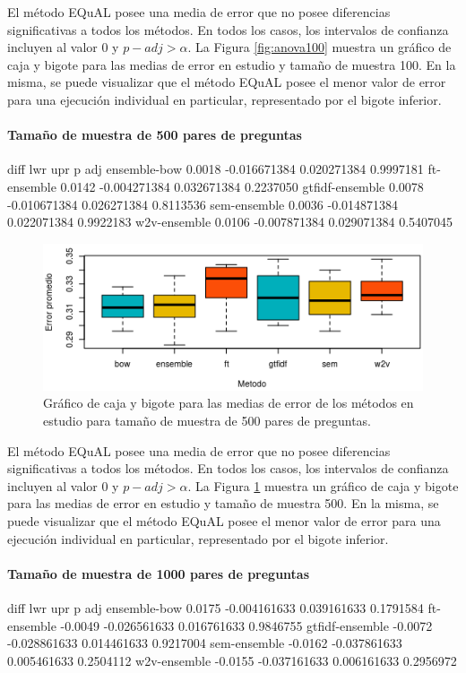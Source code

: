 \bigskip El método EQuAL posee una media de error que no posee diferencias significativas a todos los métodos. En todos los casos, los intervalos de confianza incluyen al valor 0 y \(p{-}adj > \alpha\). La Figura \ref{fig:anova100} muestra un gráfico de caja y bigote para las medias de error en estudio y tamaño de muestra 100. En la misma, se puede visualizar que el método EQuAL posee el menor valor de error para una ejecución individual en particular, representado por el bigote inferior.

\bigskip
\paragraph{Tamaño de muestra de 500 pares de preguntas}
\begin{rc}
                  diff          lwr         upr     p adj
ensemble-bow     0.0018 -0.016671384 0.020271384 0.9997181
ft-ensemble      0.0142 -0.004271384 0.032671384 0.2237050
gtfidf-ensemble  0.0078 -0.010671384 0.026271384 0.8113536
sem-ensemble     0.0036 -0.014871384 0.022071384 0.9922183
w2v-ensemble     0.0106 -0.007871384 0.029071384 0.5407045
\end{rc}

\begin{figure}
	\centering
	\includegraphics[width=0.7\linewidth]{10_resultados/imagenes/anova_500}
	\caption{Gráfico de caja y bigote para las medias de error de los métodos en estudio para tamaño de muestra de 500 pares de preguntas.}
	\label{fig:anova500}
\end{figure}

\bigskip El método EQuAL posee una media de error que no posee diferencias significativas a todos los métodos. En todos los casos, los intervalos de confianza incluyen al valor 0 y \(p{-}adj > \alpha\). La Figura \ref{fig:anova500} muestra un gráfico de caja y bigote para las medias de error en estudio y tamaño de muestra 500. En la misma, se puede visualizar que el método EQuAL posee el menor valor de error para una ejecución individual en particular, representado por el bigote inferior.

\bigskip
\paragraph{Tamaño de muestra de 1000 pares de preguntas}
\begin{rc}
                  diff          lwr         upr     p adj
ensemble-bow     0.0175 -0.004161633 0.039161633 0.1791584
ft-ensemble     -0.0049 -0.026561633 0.016761633 0.9846755
gtfidf-ensemble -0.0072 -0.028861633 0.014461633 0.9217004
sem-ensemble    -0.0162 -0.037861633 0.005461633 0.2504112
w2v-ensemble    -0.0155 -0.037161633 0.006161633 0.2956972
\end{rc}

